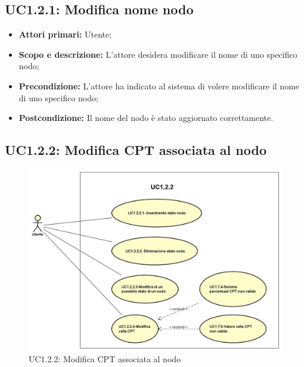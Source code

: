 \subsection{UC1.2.1: Modifica nome nodo} 
\begin{itemize} 
	\item{\textbf{Attori primari:} Utente;} 
	\item{\textbf{Scopo e descrizione:} L'attore desidera modificare il nome di uno specifico nodo;} 
	\item{\textbf{Precondizione:} L'attore ha indicato al sistema di volere modificare il nome di uno specifico nodo;} 
	\item{\textbf{Postcondizione:} Il nome del nodo è stato aggiornato correttamente.} 
\end{itemize} 
\subsection{UC1.2.2: Modifica CPT associata al nodo} 
\begin{figure} [H]
	\centering
	\includegraphics[scale=0.45]{Img/UC1-2-2} 
	\caption{UC1.2.2: Modifica CPT associata al nodo} \label{} 
\end{figure} 
